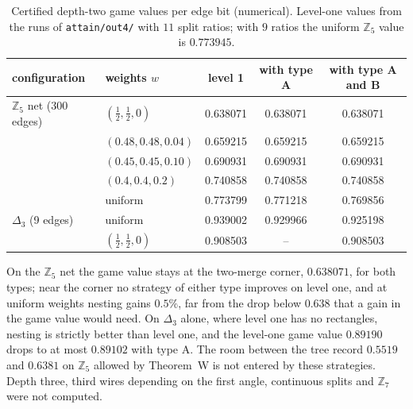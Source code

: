 \documentclass[10pt]{amsart}
\theoremstyle{plain}
\theoremstyle{definition}
\theoremstyle{remark}
\numberwithin{equation}{section}
\newcommand{\Z}{\mathbb{Z}}
\newcommand{\stN}{numerical}
\begin{document}
\begin{table}[ht]
\small
\begin{tabular}{@{}llccc@{}}
\toprule
configuration & weights $w$ & level 1 & with type A & with type A and B\\
\midrule
$\Z_5$ net (300 edges) & $(\tfrac12,\tfrac12,0)$ & 0.638071 & 0.638071 & 0.638071\\
& $(0.48,0.48,0.04)$ & 0.659215 & 0.659215 & 0.659215\\
& $(0.45,0.45,0.10)$ & 0.690931 & 0.690931 & 0.690931\\
& $(0.4,0.4,0.2)$ & 0.740858 & 0.740858 & 0.740858\\
& uniform & 0.773799 & 0.771218 & 0.769856\\
$\Delta_3$ (9 edges) & uniform & 0.939002 & 0.929966 & 0.925198\\
& $(\tfrac12,\tfrac12,0)$ & 0.908503 & -- & 0.908503\\
\bottomrule
\end{tabular}
\caption{Certified depth-two game values per edge bit (\stN). Level-one values from the runs of
\texttt{\small attain/out4/} with $11$ split ratios; with $9$ ratios the uniform $\Z_5$ value is $0.773945$.}\label{tab:depth2}
\end{table}

On the $\Z_5$ net the game value stays at the two-merge corner, $0.638071$, for both types; near the corner no
strategy of either type improves on level one, and at uniform weights nesting gains $0.5\%$, far from the drop
below $0.638$ that a gain in the game value would need. On $\Delta_3$ alone, where level one has no rectangles,
nesting is strictly better than level one, and the level-one game value $0.89190$ drops to at most $0.89102$
with type A. The room between the tree record $0.5519$ and $0.6381$ on $\Z_5$ allowed by Theorem~W is not
entered by these strategies. Depth three, third wires depending on the first angle, continuous splits and
$\Z_7$ were not computed.
\end{document}
